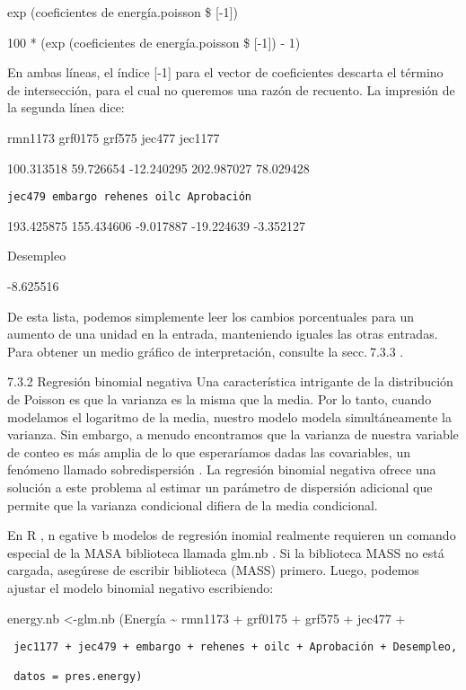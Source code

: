 \documentclass[
]{book}
\begin{document}
exp (coeficientes de energía.poisson \$ {[}-1{]})

100 * (exp (coeficientes de energía.poisson \$ {[}-1{]}) - 1)

En ambas líneas, el índice {[}-1{]} para el vector de coeficientes descarta el término de intersección, para el cual no queremos una razón de recuento. La impresión de la segunda línea dice:

rmn1173 grf0175 grf575 jec477 jec1177

100.313518 59.726654 -12.240295 202.987027 78.029428

\begin{verbatim}
jec479 embargo rehenes oilc Aprobación
\end{verbatim}

193.425875 155.434606 -9.017887 -19.224639 -3.352127

Desempleo

-8.625516

De esta lista, podemos simplemente leer los cambios porcentuales para un aumento de una unidad en la entrada, manteniendo iguales las otras entradas. Para obtener un medio gráfico de interpretación, consulte la secc. 7.3.3 .

7.3.2 Regresión binomial negativa
Una característica intrigante de la distribución de Poisson es que la varianza es la misma que la media. Por lo tanto, cuando modelamos el logaritmo de la media, nuestro modelo modela simultáneamente la varianza. Sin embargo, a menudo encontramos que la varianza de nuestra variable de conteo es más amplia de lo que esperaríamos dadas las covariables, un fenómeno llamado sobredispersión . La regresión binomial negativa ofrece una solución a este problema al estimar un parámetro de dispersión adicional que permite que la varianza condicional difiera de la media condicional.

En R , n egative b modelos de regresión inomial realmente requieren un comando especial de la MASA biblioteca llamada glm.nb . Si la biblioteca MASS no está cargada, asegúrese de escribir biblioteca (MASS) primero. Luego, podemos ajustar el modelo binomial negativo escribiendo:

energy.nb \textless-glm.nb (Energía \textasciitilde{} rmn1173 + grf0175 + grf575 + jec477 +

\begin{verbatim}
 jec1177 + jec479 + embargo + rehenes + oilc + Aprobación + Desempleo,

 datos = pres.energy)
\end{verbatim}
\end{document}
